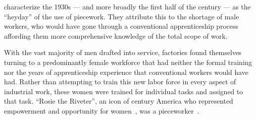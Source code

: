 \documentclass[trackingWork]{subfiles}
\begin{document}
\citeauthor{hart2013rise} characterize the 1930s
--- and more broadly the first half of the  century ---
as the ``heyday'' of the use of piecework.
They attribute this to the shortage of male workers,
who would have gone through a conventional apprenticeship process
affording them more comprehensive knowledge of the total scope of work.

With the vast majority of men drafted into service,
factories found themselves turning to
a predominantly female workforce that had neither
the formal training nor
the years of apprenticeship experience
that conventional workers would have had.
Rather than attempting to train this new labor force in every aspect of industrial work,
these women were trained for individual tasks
and assigned to that task. %
``Rosie the Riveter'',
an icon of  century America who
represented empowerment and opportunity for women~\cite{honey1985creating},
was a pieceworker~\cite{davies2014origins}.






\end{document}
